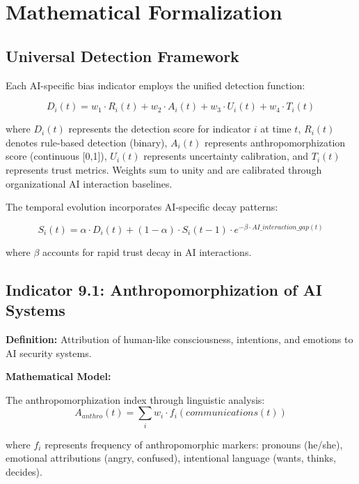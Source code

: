 \documentclass[11pt,a4paper]{article}
\begin{document}
\section{Mathematical Formalization}

\subsection{Universal Detection Framework}

Each AI-specific bias indicator employs the unified detection function:

\begin{equation}
D_i(t) = w_1 \cdot R_i(t) + w_2 \cdot A_i(t) + w_3 \cdot U_i(t) + w_4 \cdot T_i(t)
\end{equation}

where $D_i(t)$ represents the detection score for indicator $i$ at time $t$, $R_i(t)$ denotes rule-based detection (binary), $A_i(t)$ represents anthropomorphization score (continuous [0,1]), $U_i(t)$ represents uncertainty calibration, and $T_i(t)$ represents trust metrics. Weights sum to unity and are calibrated through organizational AI interaction baselines.

The temporal evolution incorporates AI-specific decay patterns:

\begin{equation}
S_i(t) = \alpha \cdot D_i(t) + (1-\alpha) \cdot S_i(t-1) \cdot e^{-\beta \cdot AI\_interaction\_gap(t)}
\end{equation}

where $\beta$ accounts for rapid trust decay in AI interactions.

\subsection{Indicator 9.1: Anthropomorphization of AI Systems}

\textbf{Definition:} Attribution of human-like consciousness, intentions, and emotions to AI security systems.

\textbf{Mathematical Model:}

The anthropomorphization index through linguistic analysis:
\begin{equation}
A_{anthro}(t) = \sum_{i} w_i \cdot f_i(communications(t))
\end{equation}

where $f_i$ represents frequency of anthropomorphic markers: pronouns (he/she), emotional attributions (angry, confused), intentional language (wants, thinks, decides).
\end{document}
